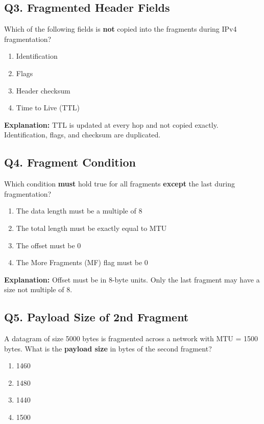 \subsection*{Q3. Fragmented Header Fields}
Which of the following fields is \textbf{not} copied into the fragments during IPv4 fragmentation?

\begin{enumerate}[label=(\alph*)]
    \item Identification  
    \item Flags  
    \item Header checksum  
    \item Time to Live (TTL)  
\end{enumerate}

\textbf{Explanation:} TTL is updated at every hop and not copied exactly. Identification, flags, and checksum are duplicated.

\vspace{1em}

\subsection*{Q4. Fragment Condition}
Which condition \textbf{must} hold true for all fragments \textbf{except} the last during fragmentation?

\begin{enumerate}[label=(\alph*)]
    \item The data length must be a multiple of 8  
    \item The total length must be exactly equal to MTU  
    \item The offset must be 0  
    \item The More Fragments (MF) flag must be 0  
\end{enumerate}

\textbf{Explanation:} Offset must be in 8-byte units. Only the last fragment may have a size not multiple of 8.

\vspace{1em}

\subsection*{Q5. Payload Size of 2nd Fragment}
A datagram of size 5000 bytes is fragmented across a network with MTU = 1500 bytes. What is the \textbf{payload size} in bytes of the second fragment?

\begin{enumerate}[label=(\alph*)]
    \item 1460  
    \item 1480  
    \item 1440  
    \item 1500  
\end{enumerate}

